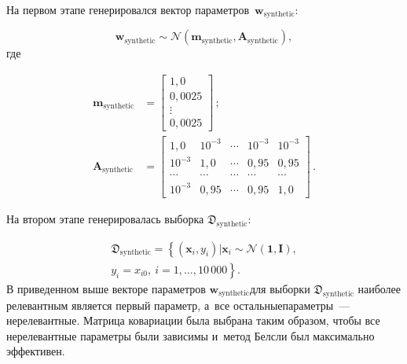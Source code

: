 \begin{multicols}{2}
\vspace*{9pt}


\noindent
 На первом этапе генерировался вектор па\-ра\-мет\-ров~$\mathbf{w}_{\mathrm{synthetic}}$:
 
 \noindent
\begin{equation*}
\mathbf{w}_{\mathrm{synthetic}}  \sim \mathcal{N}\left(\mathbf{m}_{\mathrm{synthetic}}, 
\mathbf{A}_{\mathrm{synthetic}}\right), 
\end{equation*}
где

\vspace*{-9pt}

\noindent
\begin{align*}
\mathbf{m}_{\mathrm{synthetic}} &= 
\begin{bmatrix}
1{,}0\\
0{,}0025\\[-3pt]
\vdots\\[-2pt]
0{,}0025
\end{bmatrix}\,;
\\
\mathbf{A}_{\mathrm{synthetic}} &= \begin{bmatrix}
1{,}0& 10^{-3}& \cdots& 10^{-3}& 10^{-3}\\
10^{-3}& 1{,}0& \cdots& 0{,}95& 0{,}95\\[-2pt]
\cdots&\cdots&\cdots&\cdots&\cdots\\[-2pt]
10^{-3}& 0{,}95& \cdots& 0{,}95& 1{,}0
\end{bmatrix}\,.
\end{align*}

На втором этапе генерировалась выборка $\mathfrak{D}_{\mathrm{synthetic}}$:

\vspace*{-2pt}

\noindent
\begin{multline*}
\mathfrak{D}_{\mathrm{synthetic}} = \left\{(\mathbf{x}_i,y_i)| \mathbf{x}_i \sim  
\mathcal{N}(\mathbf{1}, \mathbf{I}),\right.\\
\left. y_i = x_{i0},\ i = 1, \ldots , 10\,000\right\}. 
\end{multline*}
В приведенном выше векторе параметров $\mathbf{w}_{\mathrm{synthetic}}$\linebreak для 
выборки $\mathfrak{D}_{\mathrm{synthetic}}$ наиболее релевантным является первый 
параметр, а~все остальные\linebreak параметры~--- нерелевантные. Матрица ковариации была 
вы\-брана таким образом, чтобы все нерелевантные па\-ра\-мет\-ры были зависимы и~метод 
Белсли был максимально эффективен.








\end{multicols}
